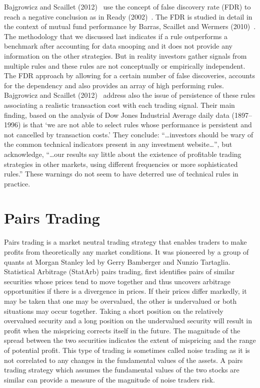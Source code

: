 Bajgrowicz and Scaillet (2012)~\cite{bajgrowicz2012technical} use the concept of false discovery rate (FDR) to reach a negative conclusion as in Ready (2002)~\cite{ready}. The FDR is studied in detail in the context of mutual fund performance by Barras, Scaillet and Wermers (2010)~\cite{barras2010false}. The methodology that we discussed last indicates if a rule outperforms a benchmark after accounting for data snooping and it does not provide any information on the other strategies. But in reality investors gather signals from multiple rules and these rules are not conceptually or empirically independent. The FDR approach by allowing for a certain number of false discoveries, accounts for the dependency and also provides an array of high performing rules. Bajgrowicz and Scaillet (2012)~\cite{bajgrowicz2012technical} address also the issue of persistence of these rules associating a realistic transaction cost with each trading signal. Their main finding, based on the analysis of Dow Jones Industrial Average daily data (1897--1996) is that `we are not able to select rules whose performance is persistent and not cancelled by transaction costs.' They conclude: ``\dots investors should be wary of the common technical indicators present in any investment website\dots'', but acknowledge, ``\dots our results say little about the existence of profitable trading strategies in other markets, using different frequencies or more sophisticated rules.'' These warnings do not seem to have deterred use of technical rules in practice. \label{in:back2}



\section{Pairs Trading} \label{in:pairs1}

Pairs trading is a market neutral trading strategy that enables traders to make profits from theoretically any market conditions. It was pioneered by a group of quants at Morgan Stanley led by Gerry Bamberger and Nunzio Tartaglia. Statistical Arbitrage (StatArb) pairs trading, first identifies pairs of similar securities whose prices tend to move together and thus uncovers arbitrage opportunities if there is a divergence in prices. If their prices differ markedly, it may be taken that one may be overvalued, the other is undervalued or both situations may occur together. Taking a short position on the relatively overvalued security and a long position on the undervalued security will result in profit when the mispricing corrects itself in the future. The magnitude of the spread between the two securities indicates the extent of mispricing and the range of potential profit. This type of trading is sometimes called noise trading as it is not correlated to any changes in the fundamental values of the assets. A pairs trading strategy which assumes the fundamental values of the two stocks are similar can provide a measure of the magnitude of noise traders risk.


